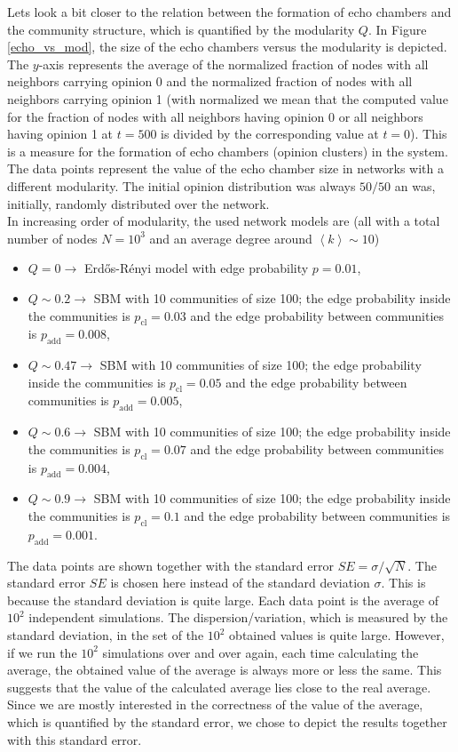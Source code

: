 \documentclass[11 pt , letterpaper , twoside , openright]{book}
\begin{document}
Lets look a bit closer to the relation between the formation of echo chambers and the community structure, which is quantified by the modularity $Q$. In Figure \ref{echo_vs_mod}, the size of the echo chambers versus the modularity is depicted. The $y$-axis represents the average of the normalized fraction of nodes with all neighbors carrying opinion 0 and the normalized fraction of nodes with all neighbors carrying opinion 1 (with normalized we mean that the computed value for the fraction of nodes with all neighbors having opinion 0 or all neighbors having opinion 1 at $t=500$ is divided by the corresponding value at $t=0$). This is a measure for the formation of echo chambers (opinion clusters) in the system. The data points represent the value of the echo chamber size in networks with a different modularity. The initial opinion distribution was always $50/50$ an was, initially, randomly distributed over the network. \\
\newpage
\noindent
In increasing order of modularity, the used network models are (all with a total number of nodes $N = 10^3$ and an average degree around $\left<k\right> \sim 10$)
\begin{itemize}
	\item $Q=0 \rightarrow$ Erd\H{o}s-R\'{e}nyi model with edge probability $p=0.01$,
	\item $Q \sim 0.2 \rightarrow$ SBM with 10 communities of size 100; the edge probability inside the communities is $p_{\text{cl}} = 0.03$ and the edge probability between communities is $p_{\text{add}} = 0.008$,
	\item $Q \sim 0.47 \rightarrow$ SBM with 10 communities of size 100; the edge probability inside the communities is $p_{\text{cl}} = 0.05$ and the edge probability between communities is $p_{\text{add}} = 0.005$,
	\item $Q \sim 0.6 \rightarrow$ SBM with 10 communities of size 100; the edge probability inside the communities is $p_{\text{cl}} = 0.07$ and the edge probability between communities is $p_{\text{add}} = 0.004$,
	\item $Q \sim 0.9 \rightarrow$ SBM with 10 communities of size 100; the edge probability inside the communities is $p_{\text{cl}} = 0.1$ and the edge probability between communities is $p_{\text{add}} = 0.001$.
\end{itemize}
The data points are shown together with the standard error $SE = \sigma /\sqrt{N}$. The standard error $SE$ is chosen here instead of the standard deviation $\sigma$. This is because the standard deviation is quite large. Each data point is the average of $10^2$ independent simulations. The dispersion/variation, which is measured by the standard deviation, in the set of the $10^2$ obtained values is quite large. However, if we run the $10^2$ simulations over and over again, each time calculating the average, the obtained value of the average is always more or less the same. This suggests that the value of the calculated average lies close to the real average. Since we are mostly interested in the correctness of the value of the average, which is quantified by the standard error, we chose to depict the results together with this standard error.\\
\end{document}
